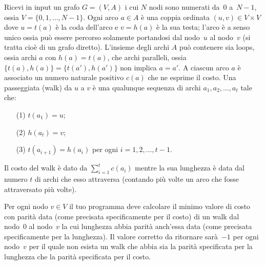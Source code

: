 \renewcommand{\nomebreve}{odd\_walks}
\renewcommand{\titolo}{Passeggiate Particolari}

\introduzione{}

Ricevi in input un grafo $G=(V,A)$ i cui $N$ nodi sono numerati da~$0$ a~$N-1$, ossia $V=\{0,1,\ldots, N-1\}$. Ogni arco $a\in A$ è una coppia ordinata $(u,v) \in V\times V$ dove $u=t(a)$ è la coda dell'arco e $v=h(a)$ è la sua testa; l'arco è a senso unico ossia può essere percorso solamente portandosi dal nodo~$u$ al nodo~$v$ (si tratta cioè di un grafo diretto). L'insieme degli archi $A$ può contenere sia loops, ossia archi $a$ con $h(a)=t(a)$, che archi paralleli, ossia $\{t(a),h(a)\}=\{t(a'),h(a')\}$ non implica $a=a'$. A ciascun arco $a$ è associato un numero naturale positivo $c(a)$ che ne esprime il costo.
Una passeggiata (walk) da $u$ a $v$ è una qualunque sequenza di archi $a_1,a_2,\ldots, a_t$ tale che:
\begin{itemize}
  \item[(1)] $t(a_1)=u$;
  \item[(2)] $h(a_t)=v$;
  \item[(3)] $t(a_{i+1}) = h(a_i)$ per ogni $i=1,2,\ldots, t-1$.
\end{itemize}
Il costo del walk è dato da $\sum_{i=1}^t c(a_i)$ mentre la sua lunghezza è data dal numero $t$ di archi che esso attraversa (contando più volte un arco che fosse attraversato più volte).

Per ogni nodo $v\in V$ il tuo programma deve calcolare il minimo valore di costo con parità data (come precisata specificamente per il costo) di un walk dal nodo~0 al nodo~$v$ la cui lunghezza abbia parità anch'essa data (come precisata specificamente per la lunghezza).
Il valore corretto da ritornare sarà~$-1$ per ogni nodo~$v$ per il quale non esista un walk che abbia sia la parità specificata per la lunghezza che la parità specificata per il costo.


